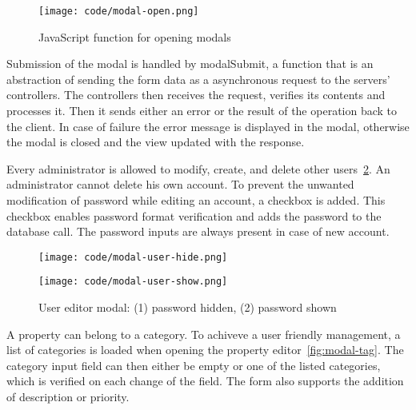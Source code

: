 \documentclass[
  digital,     %
  oneside,     %
  nosansbold,  %
  colorbold, %
  lof,         %
  lot,         %
]{fithesis4}
\begin{document}
\begin{figure}
	\begin{center}
		\begin{minipage}{.8\textwidth}
			\texttt{[image: code/modal-open.png]}
		\end{minipage}
	\end{center}
	\caption{JavaScript function for opening modals}
	\label{fig:modal-open}
\end{figure}

Submission of the modal is handled by modalSubmit, a function that is an abstraction of sending the form data as a asynchronous request to the servers' controllers. The controllers then receives the request, verifies its contents and processes it. Then it sends either an error or the result of the operation back to the client. In case of failure the error message is displayed in the modal, otherwise the modal is closed and the view updated with the response.

Every administrator is allowed to modify, create, and delete other users~\ref{fig:modal-user}. An administrator cannot delete his own account. To prevent the unwanted modification of password while editing an account, a checkbox is added. This checkbox enables password format verification and adds the password to the database call. The password inputs are always present in case of new account.

\begin{figure}[!htbp]
	\begin{center}
		\begin{minipage}{.4\textwidth}
			\texttt{[image: code/modal-user-hide.png]}
		\end{minipage}
		\begin{minipage}{.4\textwidth}
			\texttt{[image: code/modal-user-show.png]}
		\end{minipage}
	\end{center}
	\caption{User editor modal: (1) password hidden, (2) password shown}
	\label{fig:modal-user}
\end{figure}

A property can belong to a category. To achiveve a user friendly management, a list of categories is loaded when opening the property editor~\ref{fig:modal-tag}. The category input field can then either be empty or one of the listed categories, which is verified on each change of the field. The form also supports the addition of description or priority.
\end{document}
